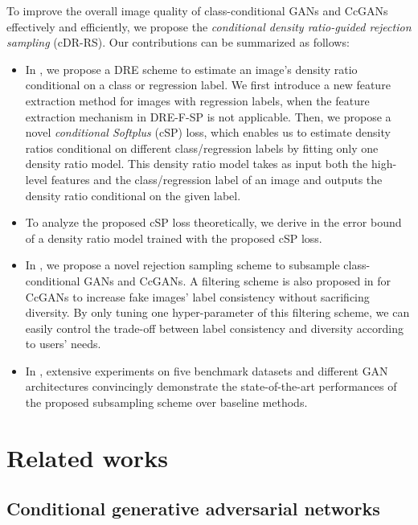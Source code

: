 \documentclass[final,12pt, 3p,times]{elsarticle}
\begin{document}
To improve the overall image quality of class-conditional GANs and CcGANs effectively and efficiently, we propose the \textit{conditional density ratio-guided rejection sampling} (cDR-RS). Our contributions can be summarized as follows:
\begin{itemize}
	\item In , we propose a DRE scheme to estimate an image's density ratio conditional on a class or regression label. We first introduce a new feature extraction method for images with regression labels, when the feature extraction mechanism in DRE-F-SP \cite{ding2020subsampling} is not applicable. Then, we propose a novel \textit{conditional Softplus} (cSP) loss, which enables us to estimate density ratios conditional on different class/regression labels by fitting only one density ratio model. This density ratio model takes as input both the high-level features and the class/regression label of an image and outputs the density ratio conditional on the given label. 
	
	\item To analyze the proposed cSP loss theoretically, we derive in  the error bound of a density ratio model trained with the proposed cSP loss.
	
	\item In , we propose a novel rejection sampling scheme to subsample class-conditional GANs and CcGANs. A filtering scheme is also proposed in  for CcGANs to increase fake images' label consistency without sacrificing diversity. By only tuning one hyper-parameter of this filtering scheme, we can easily control the trade-off between label consistency and diversity according to users' needs.
	
	\item In , extensive experiments on five benchmark datasets and different GAN architectures convincingly demonstrate the state-of-the-art performances of the proposed subsampling scheme over baseline methods. 
\end{itemize}  








\section{Related works}\label{sec:related_work}

\subsection{Conditional generative adversarial networks}\label{sec:related_GANs}
\end{document}
